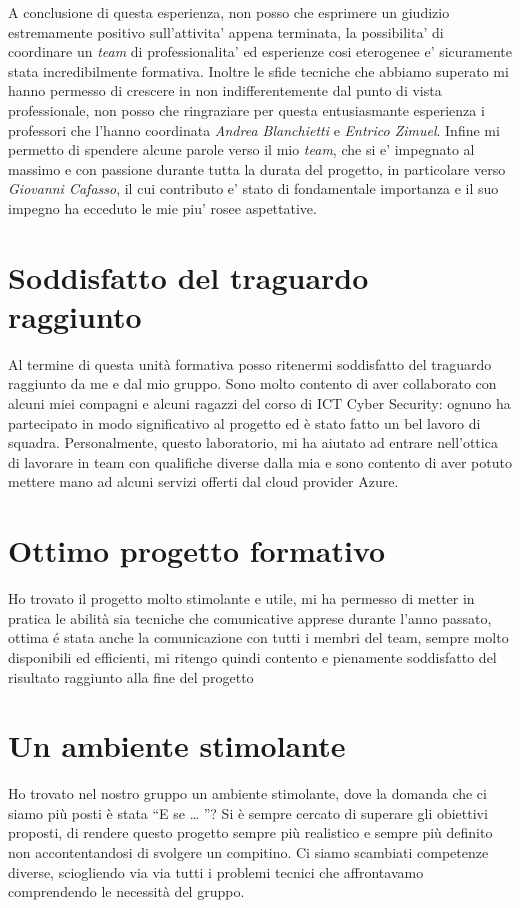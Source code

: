 \documentclass[a4paper]{report}
\begin{document}
	A conclusione di questa esperienza, non posso che esprimere un giudizio estremamente positivo sull'attivita' appena 
	terminata, la possibilita' di coordinare un \emph{team} di professionalita' ed esperienze cosi eterogenee e'
	sicuramente stata incredibilmente formativa. Inoltre le sfide tecniche che abbiamo superato mi hanno permesso di
	crescere in non indifferentemente dal punto di vista professionale, non posso che ringraziare per questa
	entusiasmante esperienza i professori che l'hanno coordinata \emph{Andrea Blanchietti} e \emph{Entrico Zimuel}.
	Infine mi permetto di spendere alcune parole verso il mio \emph{team}, che si e' impegnato
	al massimo e con passione durante tutta la durata del progetto, in particolare verso \emph{Giovanni Cafasso}, il cui
	contributo e' stato di fondamentale importanza e il suo impegno ha ecceduto le mie piu' rosee aspettative.
	\section{Soddisfatto del traguardo raggiunto}
	\author{Giovanni Cafasso}

	Al termine di questa unità formativa posso ritenermi soddisfatto del traguardo raggiunto da me e dal mio gruppo.
	Sono molto contento di aver collaborato con alcuni miei compagni e alcuni ragazzi del corso di ICT Cyber Security: ognuno ha partecipato in modo significativo al progetto ed è stato fatto un bel lavoro di squadra.
	Personalmente, questo laboratorio, mi ha aiutato ad entrare nell'ottica di lavorare in team con qualifiche diverse dalla mia e sono contento di aver potuto mettere mano ad alcuni servizi offerti dal cloud provider Azure.
	\section{Ottimo progetto formativo}
	\author{Riccardo Carrieri}

	Ho trovato il progetto molto stimolante e utile, mi ha permesso di metter in pratica le abilità sia tecniche che comunicative apprese durante l'anno passato, ottima é stata anche la comunicazione con tutti i membri del team, sempre molto disponibili ed efficienti, mi ritengo quindi contento e pienamente soddisfatto del risultato raggiunto alla fine del progetto
	\section{Un ambiente stimolante}
	\author{Alessio Murta}

	Ho trovato nel nostro gruppo un ambiente stimolante, dove la domanda che ci siamo più posti è stata “E se … ”? Si
	è sempre cercato di superare gli obiettivi proposti, di rendere questo progetto sempre più realistico e sempre più
	definito non accontentandosi di svolgere un compitino. Ci siamo scambiati competenze diverse, sciogliendo via via
	tutti i problemi tecnici che affrontavamo comprendendo le necessità del gruppo. %
\end{document}
